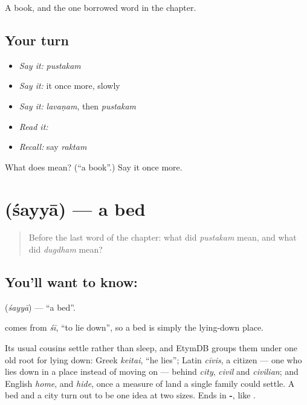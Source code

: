 \begin{grammarlens}[title={What you've built}]
A book, and the one borrowed word in the chapter.
\end{grammarlens}

\subsection*{Your turn}
\begin{itemize}
\raggedright
  \item \emph{Say it:} \emph{pustakam}
  \item \emph{Say it:} it once more, slowly
  \item \emph{Say it:} \emph{lavaṇam}, then \emph{pustakam}
  \item \emph{Read it:} \textbf{}
  \item \emph{Recall:} say \emph{raktam}
\end{itemize}

\begin{tcolorbox}[breakable,colback=teal!4,colframe=teal!35!black,title={Before you move on}]
What does  mean? (\textquotedblleft{}a book\textquotedblright{}.) Say it once more.
\end{tcolorbox}
\section[\texorpdfstring{\sk{शय्या} (śayyā)}{शय्या (śayyā)}]{ (śayyā) — a bed}

\label{lesson:SA-C35-bed}



\begin{quote}
Before the last word of the chapter: what did \emph{pustakam} mean, and what did \emph{dugdham} mean?
\end{quote}

\subsection*{You'll want to know: }
\textbf{} (\emph{śayyā}) — \textquotedblleft{}a bed\textquotedblright{}.

\textbf{} comes from \emph{śī}, \textquotedblleft{}to lie down\textquotedblright{}, so a bed is simply the lying-down place.

Its usual cousins settle rather than sleep, and EtymDB groups them under one old root for lying down: Greek \emph{keitai}, \textquotedblleft{}he lies\textquotedblright{}; Latin \emph{cīvis}, a citizen — one who lies down in a place instead of moving on — behind \emph{city}, \emph{civil} and \emph{civilian}; and English \emph{home}, and \emph{hide}, once a measure of land a single family could settle. A bed and a city turn out to be one idea at two sizes. Ends in \textbf{-}, like \textbf{}.

